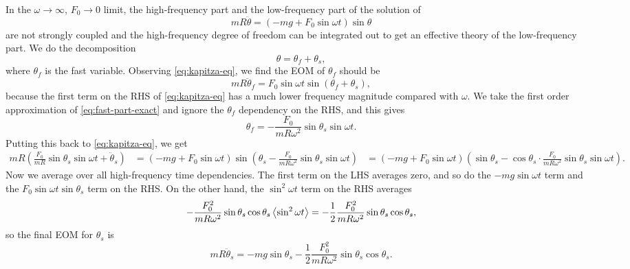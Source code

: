 \documentclass[hyperref, a4paper]{article}
\def\\{}%
\begin{document}
In the $\omega \to \infty$, $F_0 \to 0$ limit, 
the high-frequency part and the low-frequency part of 
the solution of 
\begin{equation}
    m R \ddot{\theta}=\left(-m g+F_0 \sin \omega t\right) \sin \theta
    \label{eq:kapitza-eq}
\end{equation}
are not strongly coupled and the high-frequency degree of freedom can be integrated out 
to get an effective theory of the low-frequency part. 
We do the decomposition 
\begin{equation}
    \theta = \theta_f + \theta_s, 
\end{equation}
where $\theta_f$ is the fast variable. 
Observing \eqref{eq:kapitza-eq}, 
we find the EOM of $\theta_f$ should be 
\begin{equation}
    mR \ddot{\theta}_f = F_0 \sin \omega t \sin (\theta_f + \theta_s),
    \label{eq:fast-part-exact}
\end{equation}
because the first term on the RHS of \eqref{eq:kapitza-eq} 
has a much lower frequency magnitude compared with $\omega$.
We take the first order approximation of \eqref{eq:fast-part-exact} 
and ignore the $\theta_f$ dependency on the RHS,
and this gives 
\begin{equation}
    \theta_f = - \frac{F_0}{m R \omega^2} \sin \theta_s \sin \omega t.
\end{equation}
Putting this back to \eqref{eq:kapitza-eq}, 
we get 
\[
    \begin{aligned}
        m R \left(
            \frac{F_0}{mR} \sin \theta_s \sin \omega t + \ddot{\theta}_s
        \right) &= 
        (- mg + F_0 \sin \omega t) 
        \sin(
            \theta_s - \frac{F_0}{m R \omega^2} \sin \theta_s \sin \omega t
        ) \\
        &= (- mg + F_0 \sin \omega t) 
        \left(
            \sin \theta_s - \cos \theta_s \cdot \frac{F_0}{m R \omega^2} \sin \theta_s \sin \omega t
        \right).
    \end{aligned}
\]
Now we average over all high-frequency time dependencies. 
The first term on the LHS averages zero, 
and so do the $- mg \sin \omega t$ term and 
the $F_0 \sin \omega t \sin \theta_s$ term on the RHS. 
On the other hand, 
the $\sin^2 \omega t$ term on the RHS averages 
\[
    - \frac{F_0^2}{m R \omega^2} \sin \theta_s \cos \theta_s \expval{\sin^2 \omega t}
    = - \frac{1}{2} \frac{F_0^2}{m R \omega^2} \sin \theta_s \cos \theta_s,
\]
so the final EOM for $\theta_s$ is 
\begin{equation}
    m R \ddot{\theta}_s = - m g \sin \theta_s 
    - \frac{1}{2} \frac{F_0^2}{m R \omega^2} \sin \theta_s \cos \theta_s.
    \label{eq:theta-s-eq}
\end{equation}
\end{document}
